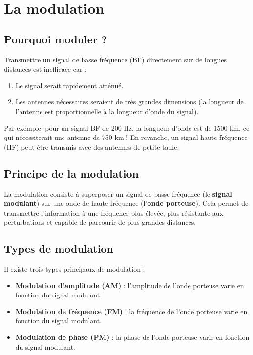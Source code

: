 \documentclass[12pt]{article}
\begin{document}
\section{La modulation}

\subsection{Pourquoi moduler ?}

Transmettre un signal de basse fréquence (BF) directement sur de longues distances est inefficace car :

\begin{enumerate}
    \item Le signal serait rapidement atténué.
    \item Les antennes nécessaires seraient de très grandes dimensions (la longueur de l’antenne est proportionnelle à la longueur d’onde du signal).
\end{enumerate}

Par exemple, pour un signal BF de 200 Hz, la longueur d’onde est de 1500 km, ce qui nécessiterait une antenne de 750 km ! En revanche, un signal haute fréquence (HF) peut être transmis avec des antennes de petite taille.

\subsection{Principe de la modulation}

La modulation consiste à superposer un signal de basse fréquence (le \textbf{signal modulant}) sur une onde de haute fréquence (l’\textbf{onde porteuse}). Cela permet de transmettre l’information à une fréquence plus élevée, plus résistante aux perturbations et capable de parcourir de plus grandes distances.

\subsection{Types de modulation}

Il existe trois types principaux de modulation :

\begin{itemize}
    \item \textbf{Modulation d’amplitude (AM)} : l’amplitude de l’onde porteuse varie en fonction du signal modulant.
    \item \textbf{Modulation de fréquence (FM)} : la fréquence de l’onde porteuse varie en fonction du signal modulant.
    \item \textbf{Modulation de phase (PM)} : la phase de l’onde porteuse varie en fonction du signal modulant.
\end{itemize}
\end{document}
